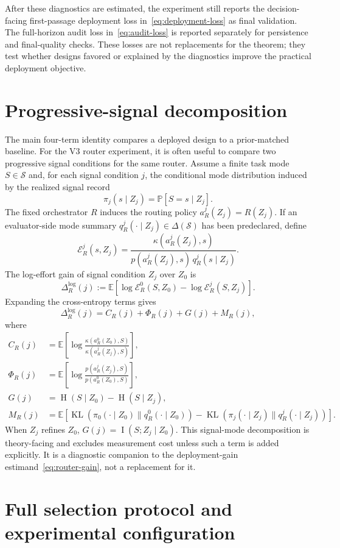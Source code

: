 \documentclass{article}
\DeclareMathOperator{\KL}{KL}
\DeclareMathOperator{\MI}{I}
\DeclareMathOperator{\Hent}{H}
\newcommand{\cS}{\mathcal{S}}
\newcommand{\E}{\mathbb{E}}
\newcommand{\Prb}{\mathbb{P}}
\begin{document}
After these diagnostics are estimated, the experiment still reports the decision-facing first-passage deployment loss in~\eqref{eq:deployment-loss} as final validation.
The full-horizon audit loss in~\eqref{eq:audit-loss} is reported separately for persistence and final-quality checks.
These losses are not replacements for the theorem; they test whether designs favored or explained by the diagnostics improve the practical deployment objective.

\section{Progressive-signal decomposition}
\label{app:operational-decomp}

The main four-term identity compares a deployed design to a prior-matched baseline.
For the V3 router experiment, it is often useful to compare two progressive signal conditions for the same router.
Assume a finite task mode $S\in\cS$ and, for each signal condition $j$, the conditional mode distribution induced by the realized signal record
\[
\pi_j(s\mid Z_j)=\Prb[S=s\mid Z_j].
\]
The fixed orchestrator $R$ induces the routing policy $a_R^j(Z_j)=R(Z_j)$.
If an evaluator-side mode summary $q_R^j(\cdot\mid Z_j)\in\Delta(\cS)$ has been predeclared, define
\[
\mathcal E_R^j(s,Z_j)
=
\frac{\kappa(a_R^j(Z_j),s)}
{p(a_R^j(Z_j),s)\,q_R^j(s\mid Z_j)} .
\]
The log-effort gain of signal condition $Z_j$ over $Z_0$ is
\[
\Delta_R^{\log}(j)
:=
\E[
\log \mathcal E_R^0(S,Z_0)-\log \mathcal E_R^j(S,Z_j)
].
\]
Expanding the cross-entropy terms gives
\[
\Delta_R^{\log}(j)
=
C_R(j)+\Phi_R(j)+G(j)+M_R(j),
\]
where
\begin{align*}
C_R(j)
&=
\E\!\left[
\log\frac{\kappa(a_R^0(Z_0),S)}{\kappa(a_R^j(Z_j),S)}
\right],
\\
\Phi_R(j)
&=
\E\!\left[
\log\frac{p(a_R^j(Z_j),S)}{p(a_R^0(Z_0),S)}
\right],
\\
G(j)
&=
\Hent(S\mid Z_0)-\Hent(S\mid Z_j),
\\
M_R(j)
&=
\E\!\left[
\KL(\pi_0(\cdot\mid Z_0)\|q_R^0(\cdot\mid Z_0))
-
\KL(\pi_j(\cdot\mid Z_j)\|q_R^j(\cdot\mid Z_j))
\right].
\end{align*}
When $Z_j$ refines $Z_0$, $G(j)=\MI(S;Z_j\mid Z_0)$.
This signal-mode decomposition is theory-facing and excludes measurement cost unless such a term is added explicitly.
It is a diagnostic companion to the deployment-gain estimand~\eqref{eq:router-gain}, not a replacement for it.

\section{Full selection protocol and experimental configuration}
\label{app:experiment-details}
\end{document}

